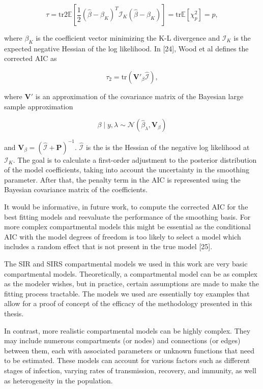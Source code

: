 \documentclass[
11pt, %
oneside, %
english, %
singlespacing, %
]{macthesis} %
\begin{document}
\[
\tau = \text{tr}2\mathbb{E}\left[\frac{1}{2} (\hat{\beta} - \beta_K)^T \mathbf{ \mathcal{I}}_K (\hat{\beta} - \beta_K)\right] = \text{tr}  \mathbb{E}[\chi^2_p] = p,
\]

where \(\beta_K\) is the coefficient vector minimizing the K-L divergence and \(\mathbf{ \mathcal{I}}_K\) is the expected negative Hessian of the log likelihood. In {[}24{]}, Wood et al defines the corrected AIC as

\[
\tau_2 = \text{tr}(\mathbf{V}'_{\beta}\hat{\mathbf{ \mathcal{I}}}),
\]

where \(\mathbf{V}'\) is an approximation of the covariance matrix of the Bayesian large sample approximation

\[
\beta \mid y,\lambda \sim \mathcal{N}(\hat{\beta}_{\lambda},\mathbf{V}_{\beta})
\]

and \(\mathbf{V}_{\beta} = (\hat{\mathbf{\mathcal{I}}} + \mathbf{P})^{-1}\). \(\hat{\mathbf{ \mathcal{I}}}\) is the is the Hessian of the negative log likelihood at \(\mathbf{ \mathcal{I}}_K\). The goal is to calculate a first-order adjustment to the posterior distribution of the model coefficients, taking into account the uncertainty in the smoothing parameter. After that, the penalty term in the AIC is represented using the Bayesian covariance matrix of the coefficients.

It would be informative, in future work, to compute the corrected AIC for the best fitting models and reevaluate the performance of the smoothing basis. For more complex compartmental models this might be essential as the conditional AIC with the model degrees of freedom is too likely to select a model which includes a random effect that is not present in the true model {[}25{]}.

The SIR and SIRS compartmental models we used in this work are very basic compartmental models. Theoretically, a compartmental model can be as complex as the modeler wishes, but in practice, certain assumptions are made to make the fitting process tractable. The models we used are essentially toy examples that allow for a proof of concept of the efficacy of the methodology presented in this thesis.

In contrast, more realistic compartmental models can be highly complex. They may include numerous compartments (or nodes) and connections (or edges) between them, each with associated parameters or unknown functions that need to be estimated. These models can account for various factors such as different stages of infection, varying rates of transmission, recovery, and immunity, as well as heterogeneity in the population.
\end{document}
